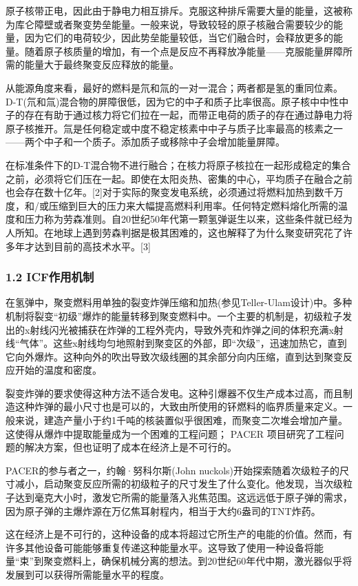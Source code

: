 原子核带正电，因此由于静电力相互排斥。克服这种排斥需要大量的能量，这被称为库仑障壁或者聚变势垒能量。一般来说，导致较轻的原子核融合需要较少的能量，因为它们的电荷较少，因此势垒能量较低，当它们融合时，会释放更多的能量。随着原子核质量的增加，有一个点是反应不再释放净能量——克服能量屏障所需的能量大于最终聚变反应释放的能量。

从能源角度来看，最好的燃料是氘和氚的一对一混合；两者都是氢的重同位素。D-T(氘和氚)混合物的屏障很低，因为它的中子和质子比率很高。原子核中中性中子的存在有助于通过核力将它们拉在一起，而带正电荷的质子的存在通过静电力将原子核推开。氚是任何稳定或中度不稳定核素中中子与质子比率最高的核素之一——两个中子和一个质子。添加质子或移除中子会增加能量屏障。

在标准条件下的D-T混合物不进行融合；在核力将原子核拉在一起形成稳定的集合之前，必须将它们压在一起。即使在太阳炎热、密集的中心，平均质子在融合之前也会存在数十亿年。[2]对于实际的聚变发电系统，必须通过将燃料加热到数千万度，和/或压缩到巨大的压力来大幅提高燃料利用率。任何特定燃料熔化所需的温度和压力称为劳森准则。自20世纪50年代第一颗氢弹诞生以来，这些条件就已经为人所知。在地球上遇到劳森判据是极其困难的，这也解释了为什么聚变研究花了许多年才达到目前的高技术水平。[3]
\subsubsection{1.2 ICF作用机制}
在氢弹中，聚变燃料用单独的裂变炸弹压缩和加热(参见Teller-Ulam设计)中。多种机制将裂变“初级”爆炸的能量转移到聚变燃料中。一个主要的机制是，初级粒子发出的x射线闪光被捕获在炸弹的工程外壳内，导致外壳和炸弹之间的体积充满x射线“气体”。这些x射线均匀地照射到聚变区的外部，即“次级”，迅速加热它，直到它向外爆炸。这种向外的吹出导致次级线圈的其余部分向内压缩，直到达到聚变反应开始的温度和密度。

裂变炸弹的要求使得这种方法不适合发电。这种引爆器不仅生产成本过高，而且制造这种炸弹的最小尺寸也是可以的，大致由所使用的钚燃料的临界质量来定义。一般来说，建造产量小于约1千吨的核装置似乎很困难，而聚变二次堆会增加产量。这使得从爆炸中提取能量成为一个困难的工程问题； PACER 项目研究了工程问题的解决方案，但也证明了成本在经济上是不可行的。

PACER的参与者之一，约翰·努科尔斯(John nuckols)开始探索随着次级粒子的尺寸减小，启动聚变反应所需的初级粒子的尺寸发生了什么变化。他发现，当次级粒子达到毫克大小时，激发它所需的能量落入兆焦范围。这远远低于原子弹的需求，因为原子弹的主爆炸源在万亿焦耳射程内，相当于大约6盎司的TNT炸药。

这在经济上是不可行的，这种设备的成本将超过它所生产的电能的价值。然而，有许多其他设备可能能够重复传递这种能量水平。这导致了使用一种设备将能量“束”到聚变燃料上，确保机械分离的想法。到20世纪60年代中期，激光器似乎将发展到可以获得所需能量水平的程度。

